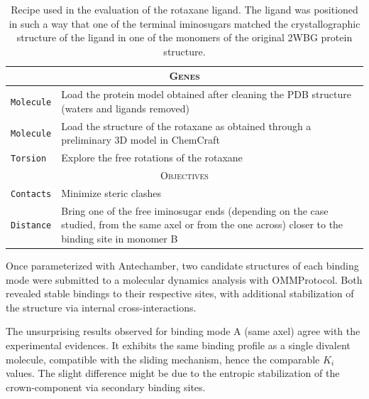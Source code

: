 \begin{table}[hbtp]
	\caption[Rotaxane recipe]{Recipe used in the evaluation of the rotaxane ligand. The ligand was positioned in such a way that one of the terminal iminosugars matched the crystallographic structure of the ligand in one of the monomers of the original 2WBG protein structure.}
	\label{table:recipe-rotaxane}
	\footnotesize
	\newcommand{\tableheading}[1]{\multicolumn{2}{c}{\textsc{#1}}}
	\begin{tabularx}{\textwidth}{RL}
		\toprule
		\tableheading{Genes}\\
		\toprule
		\texttt{Molecule} & Load the protein model obtained after cleaning the PDB structure\cite{pdb:2wbg} (waters and ligands removed) \\
		\midrule
		\texttt{Molecule} & Load the structure of the rotaxane as obtained through a preliminary 3D model in ChemCraft \\
		\midrule
		\texttt{Torsion} & Explore the free rotations of the rotaxane \\
		\toprule
		\tableheading{Objectives}\\
		\toprule
		\texttt{Contacts} & Minimize steric clashes \\
		\midrule
		\texttt{Distance} & Bring one of the free iminosugar ends (depending on the case studied, from the same axel or from the one across) closer to the binding site in monomer B \\

		\bottomrule

	\end{tabularx}
\end{table}

Once parameterized with Antechamber,\cite{wang2001antechamber} two candidate structures of each binding mode were submitted to a molecular dynamics analysis with OMMProtocol. Both revealed stable bindings to their respective sites, with additional stabilization of the structure via internal cross-interactions.

The unsurprising results observed for binding mode A (same axel) agree with the experimental evidences. It exhibits the same binding profile as a single divalent molecule, compatible with the sliding mechanism, hence the comparable $K_{i}$ values. The slight difference might be due to the entropic stabilization of the crown-component via secondary binding sites.

